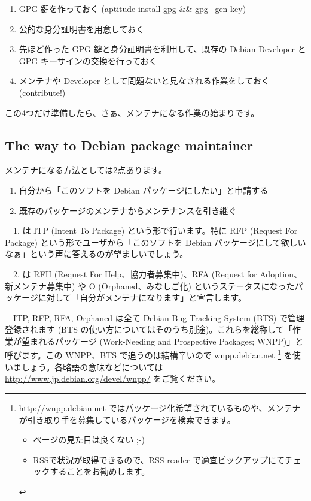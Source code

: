 \documentclass[mingoth,a4paper]{jsarticle}
\begin{document}
\begin{enumerate}
 \item GPG 鍵を作っておく (aptitude install gpg \&\& gpg --gen-key)
 \item 公的な身分証明書を用意しておく
 \item 先ほど作った GPG 鍵と身分証明書を利用して、既存の Debian Developer とGPG キーサインの交換を行っておく
 \item メンテナや Developer として問題ないと見なされる作業をしておく (contribute!)
\end{enumerate}

この4つだけ準備したら、さぁ、メンテナになる作業の始まりです。


\subsection{The way to Debian package maintainer}

メンテナになる方法としては2点あります。

\begin{enumerate}
 \item 自分から「このソフトを Debian パッケージにしたい」と申請する
 \item 既存のパッケージのメンテナからメンテナンスを引き継ぐ
\end{enumerate}

　1. は ITP (Intent To Package) という形で行います。特に RFP (Request For Package) という形でユーザから「このソフトを Debian パッケージにして欲しいなぁ」という声に答えるのが望ましいでしょう。

　2. は RFH (Request For Help、協力者募集中)、RFA (Request for Adoption、新メンテナ募集中) や O (Orphaned、みなしご化) というステータスになったパッケージに対して「自分がメンテナになります」と宣言します。

　ITP, RFP, RFA, Orphaned は全て Debian Bug Tracking System (BTS) で管理登録されます (BTS の使い方についてはそのうち別途)。これらを総称して「作業が望まれるパッケージ (Work-Needing and Prospective Packages; WNPP)」と呼びます。この WNPP、BTS で追うのは結構辛いので wnpp.debian.net \footnote{ \url{http://wnpp.debian.net} ではパッケージ化希望されているものや、メンテナが引き取り手を募集しているパッケージを検索できます。
\begin{itemize}
 \item ページの見た目は良くない ;-)
 \item RSSで状況が取得できるので、RSS reader で適宜ピックアップにてチェックすることをお勧めします。
\end{itemize}} を使いましょう。各略語の意味などについては \url{http://www.jp.debian.org/devel/wnpp/} をご覧ください。
\end{document}
